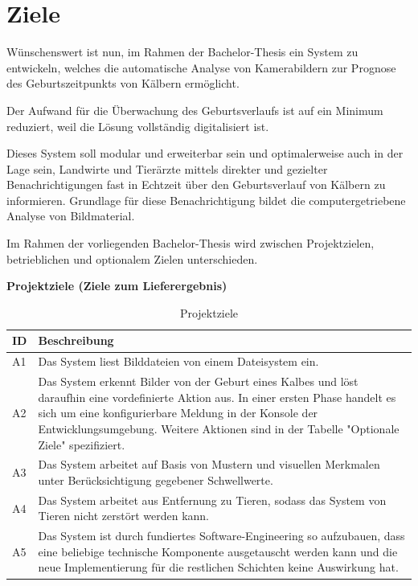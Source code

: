 \section{Ziele }

Wünschenswert ist nun, im Rahmen der Bachelor-Thesis ein System zu entwickeln, welches die automatische Analyse von Kamerabildern zur Prognose des Geburtszeitpunkts von Kälbern ermöglicht.

Der Aufwand für die Überwachung des Geburtsverlaufs ist auf ein Minimum reduziert, weil die Lösung vollständig digitalisiert ist.

Dieses System soll modular und erweiterbar sein und optimalerweise auch in der Lage sein, Landwirte und Tierärzte mittels direkter und gezielter Benachrichtigungen fast in Echtzeit über den Geburtsverlauf von Kälbern zu informieren. Grundlage für diese Benachrichtigung bildet die computergetriebene Analyse von Bildmaterial.

Im Rahmen der vorliegenden Bachelor-Thesis wird zwischen Projektzielen, betrieblichen und optionalem Zielen unterschieden.


\textbf{Projektziele (Ziele zum Lieferergebnis)}

\begin{table} [H]
	
	
	\begin{tabular}{ p{1cm} p{14cm} }
				
		\toprule[1pt]
		\rowcolor{maroon!30}	
		ID & Beschreibung \\
		
		\midrule 
		A1 & Das System liest Bilddateien von einem Dateisystem ein.\\		
		A2 & Das System erkennt Bilder von der Geburt eines Kalbes und löst daraufhin eine vordefinierte Aktion aus. In einer ersten Phase handelt es sich um eine konfigurierbare Meldung in der Konsole der Entwicklungsumgebung. Weitere Aktionen sind in der Tabelle "{}Optionale Ziele"{}  spezifiziert.\\				
		A3 & Das System arbeitet auf Basis von Mustern und visuellen Merkmalen unter Berücksichtigung gegebener Schwellwerte. \\		
		A4 & Das System arbeitet aus Entfernung zu Tieren, sodass das System von Tieren nicht zerstört werden kann.\\				
		A5 & Das System ist durch fundiertes Software-Engineering so aufzubauen,
		dass eine beliebige technische Komponente ausgetauscht werden kann und die
		neue Implementierung für die restlichen Schichten keine Auswirkung hat.\\		
		
		\bottomrule
	\end{tabular}
	\caption{Projektziele}
	\label{tab: Projektziele}
\end{table}

